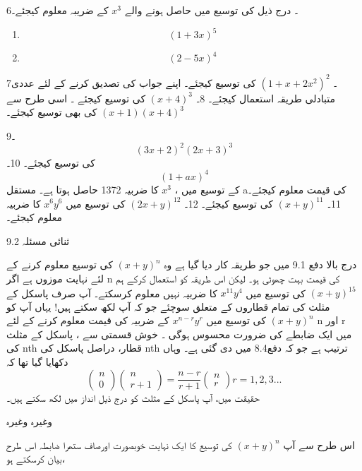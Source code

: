 6۔ درج ذیل کی توسیع میں حاصل ہونے والے
 \(x^{3}\)
  کے ضریبہ معلوم کیجئے۔ 
  \begin{multicols}{2}
   \begin{enumerate}
      \item
 \[(1+3x)^5\]
    \item
    \[(2-5x)^4\]
          \end{enumerate}
    \end{multicols}

7۔ 
   \((1+x+2x^{2})^{2}\)
کی توسیع کیجئے۔ اپنے جواب کی تصدیق کرنے کے لئے عددی متبادلی طریقہ استعمال کیجئے۔ 
8۔ 
    \((x+4)^{3}\)
کی توسیع کیجئے ۔ اسی طرح سے
 \((x+1)(x+4)^{3}\)
کی بھی توسیع کیجئے۔ 

9۔ 
 \[ (3x+2)^{2}(2x+3)^{3}\]
کی توسیع کیجئے۔ 
10۔ 
  \[(1+ax)^{4}\]
کے توسیع میں ،
\(x^{3}\)
کا ضربیہ 
1372
حاصل ہوتا ہے۔ مستقل aکی قیمت معلوم کیجئے۔ 
11۔ 
 \((x+y)^{11}\)
کی توسیع کیجئے۔ 
12۔
  \((2x+y)^{12}\)
کی توسیع میں 
 \( x^{6}y^{6}\)
کا ضربیہ معلوم کیجئے۔ 

9.2 ثنائی مسئلہ

درج بالا دفع 9.1 میں جو طریقہ کار دیا گیا ہے وہ 
  \((x+y)^n\)
کی توسیع معلوم کرنے کے لئے نہایت موزوں ہے اگر n کی قیمت بہت چھوٹی ہو۔ لیکن اس طریقہ کو استعمال کرکے ہم 
  \((x+y)^{15}\)
کی توسیع میں 
 \( x^{11} y^4\)
کا ضربیہ نہیں معلوم کرسکتے۔ آپ صرف پاسکل کے مثلث کی تمام قطاروں کے متعلق سوچئے جو کہ آپ لکھ سکتے ہیں! یہاں آپ کو
  \((x+y)^{n}\)
کی توسیع میں 
  \(x^{n-r}y^r\)
کے ضربیہ کی قیمت معلوم کرنے کے لئے n اور r میں ایک ضابطے کی ضرورت محسوس ہوگی ۔ 
خوش قسمتی سے ، پاسکل کے مثلث کی nth قطار، دراصل پاسکل کی nth ترتیب ہے جو کہ دفع8.4 میں دی گئی ہے۔ وہاں دکھایا گیا تھا کہ
 \[\begin{pmatrix}
  n\\
  0
  \end{pmatrix}
   \begin{pmatrix}
     n\\r+1
     \end{pmatrix}
    =\frac{n-r}{r+1}
     \begin{pmatrix}
    n\\r
     \end{pmatrix}
     r=1,2,3...\]
حقیقت میں، آپ پاسکل کے مثلث کو درج ذیل انداز میں لکھ سکتے ہیں۔ 

وغیرہ وغیرہ 

اس طرح سے آپ 
 \((x+y)^n\)
کی توسیع کا ایک نہایت خوبصورت اورصاف ستھرا ضابطہ اس طرح بیان کرسکتے ہو،

